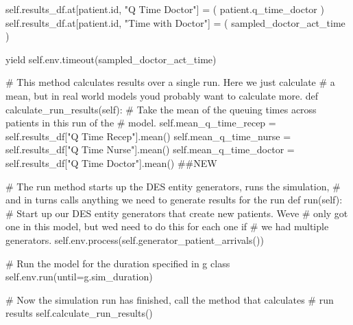 \documentclass[
  letterpaper,
  DIV=11,
  numbers=noendperiod]{scrreprt}
\newenvironment{Shaded}{}{}
\newcommand{\BuiltInTok}[1]{\textcolor[rgb]{0.84,0.23,0.29}{#1}}
\newcommand{\CommentTok}[1]{\textcolor[rgb]{0.42,0.45,0.49}{#1}}
\newcommand{\ControlFlowTok}[1]{\textcolor[rgb]{0.84,0.23,0.29}{#1}}
\newcommand{\KeywordTok}[1]{\textcolor[rgb]{0.84,0.23,0.29}{#1}}
\newcommand{\NormalTok}[1]{\textcolor[rgb]{0.14,0.16,0.18}{#1}}
\newcommand{\OperatorTok}[1]{\textcolor[rgb]{0.14,0.16,0.18}{#1}}
\newcommand{\StringTok}[1]{\textcolor[rgb]{0.01,0.18,0.38}{#1}}
\newcommand{\VariableTok}[1]{\textcolor[rgb]{0.89,0.38,0.04}{#1}}
\begin{document}
\begin{tcolorbox}
\begin{Shaded}
\begin{Highlighting}[]
                \VariableTok{self}\NormalTok{.results\_df.at[patient.}\BuiltInTok{id}\NormalTok{, }\StringTok{"Q Time Doctor"}\NormalTok{] }\OperatorTok{=}\NormalTok{ (}
\NormalTok{                    patient.q\_time\_doctor}
\NormalTok{                )}
                \VariableTok{self}\NormalTok{.results\_df.at[patient.}\BuiltInTok{id}\NormalTok{, }\StringTok{"Time with Doctor"}\NormalTok{] }\OperatorTok{=}\NormalTok{ (}
\NormalTok{                    sampled\_doctor\_act\_time}
\NormalTok{                )}

                \ControlFlowTok{yield} \VariableTok{self}\NormalTok{.env.timeout(sampled\_doctor\_act\_time)}

    \CommentTok{\# This method calculates results over a single run.  Here we just calculate}
    \CommentTok{\# a mean, but in real world models you\textquotesingle{}d probably want to calculate more.}
    \KeywordTok{def}\NormalTok{ calculate\_run\_results(}\VariableTok{self}\NormalTok{):}
        \CommentTok{\# Take the mean of the queuing times across patients in this run of the}
        \CommentTok{\# model.}
        \VariableTok{self}\NormalTok{.mean\_q\_time\_recep }\OperatorTok{=} \VariableTok{self}\NormalTok{.results\_df[}\StringTok{"Q Time Recep"}\NormalTok{].mean()}
        \VariableTok{self}\NormalTok{.mean\_q\_time\_nurse }\OperatorTok{=} \VariableTok{self}\NormalTok{.results\_df[}\StringTok{"Q Time Nurse"}\NormalTok{].mean()}
        \VariableTok{self}\NormalTok{.mean\_q\_time\_doctor }\OperatorTok{=} \VariableTok{self}\NormalTok{.results\_df[}\StringTok{"Q Time Doctor"}\NormalTok{].mean() }\CommentTok{\#\#NEW}

    \CommentTok{\# The run method starts up the DES entity generators, runs the simulation,}
    \CommentTok{\# and in turns calls anything we need to generate results for the run}
    \KeywordTok{def}\NormalTok{ run(}\VariableTok{self}\NormalTok{):}
        \CommentTok{\# Start up our DES entity generators that create new patients.  We\textquotesingle{}ve}
        \CommentTok{\# only got one in this model, but we\textquotesingle{}d need to do this for each one if}
        \CommentTok{\# we had multiple generators.}
        \VariableTok{self}\NormalTok{.env.process(}\VariableTok{self}\NormalTok{.generator\_patient\_arrivals())}

        \CommentTok{\# Run the model for the duration specified in g class}
        \VariableTok{self}\NormalTok{.env.run(until}\OperatorTok{=}\NormalTok{g.sim\_duration)}

        \CommentTok{\# Now the simulation run has finished, call the method that calculates}
        \CommentTok{\# run results}
        \VariableTok{self}\NormalTok{.calculate\_run\_results()}


\end{Highlighting}
\end{Shaded}
\end{tcolorbox}
\end{document}
